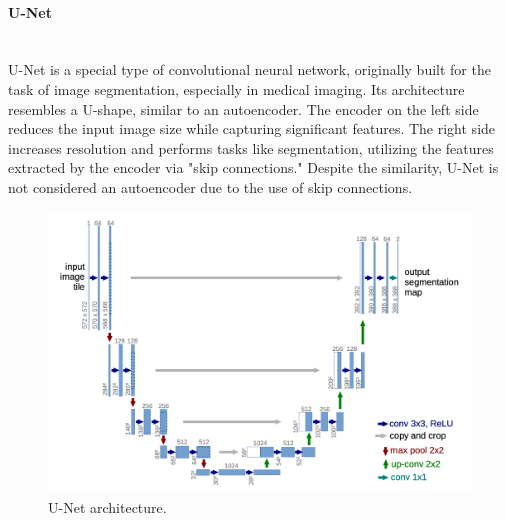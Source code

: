 \paragraph{U-Net}\mbox{}\\
\indent U-Net is a special type of convolutional neural network, originally built for the task of image segmentation, especially in medical imaging. Its architecture resembles a U-shape, similar to an autoencoder. The encoder on the left side reduces the input image size while capturing significant features. The right side increases resolution and performs tasks like segmentation, utilizing the features extracted by the encoder via "skip connections." Despite the similarity, U-Net is not considered an autoencoder due to the use of skip connections.

\begin{figure}[H]
    \centering
    \includegraphics[width=0.9\linewidth]{concept_engineering/unet/U-net.png}
    \caption{U-Net architecture\cite{RFB15a}.}
    \label{fig:unet}
\end{figure}


